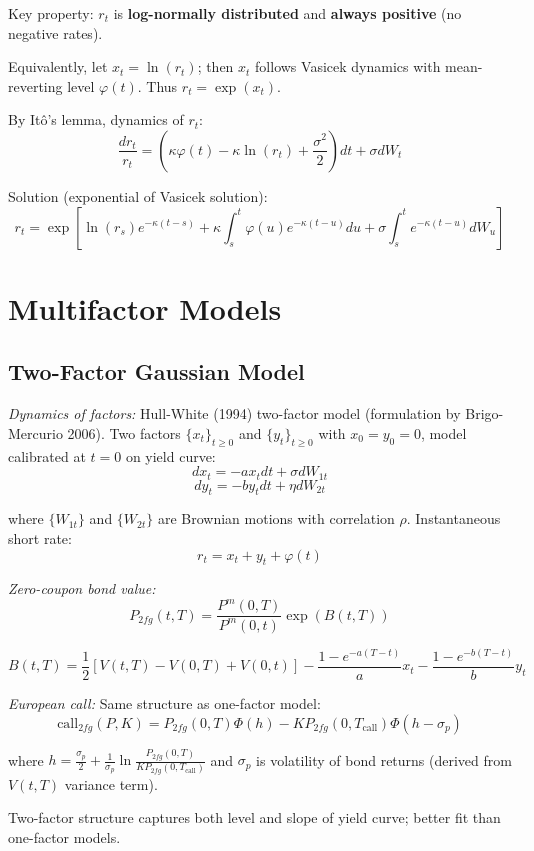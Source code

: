 \documentclass[12pt,a4paper]{article}
\begin{document}
Key property: $r_t$ is \textbf{log-normally distributed} and \textbf{always positive} (no negative rates). 

Equivalently, let $x_t = \ln(r_t)$; then $x_t$ follows Vasicek dynamics with mean-reverting level $\varphi(t)$. Thus $r_t = \exp(x_t)$.

By Itô's lemma, dynamics of $r_t$:
$$\frac{dr_t}{r_t} = \left(\kappa\varphi(t) - \kappa\ln(r_t) + \frac{\sigma^2}{2}\right)dt + \sigma dW_t$$

Solution (exponential of Vasicek solution):
$$r_t = \exp\left[\ln(r_s)e^{-\kappa(t-s)} + \kappa\int_s^t \varphi(u)e^{-\kappa(t-u)}du + \sigma\int_s^t e^{-\kappa(t-u)}dW_u\right]$$




\section{Multifactor Models}

\subsection{Two-Factor Gaussian Model}

\textit{Dynamics of factors:} Hull-White (1994) two-factor model (formulation by Brigo-Mercurio 2006). Two factors $\{x_t\}_{t \geq 0}$ and $\{y_t\}_{t \geq 0}$ with $x_0 = y_0 = 0$, model calibrated at $t=0$ on yield curve:
$$dx_t = -ax_t dt + \sigma dW_{1t}$$
$$dy_t = -by_t dt + \eta dW_{2t}$$

where $\{W_{1t}\}$ and $\{W_{2t}\}$ are Brownian motions with correlation $\rho$. Instantaneous short rate:
$$r_t = x_t + y_t + \varphi(t)$$

\textit{Zero-coupon bond value:}
$$P_{2fg}(t,T) = \frac{P^m(0,T)}{P^m(0,t)}\exp(B(t,T))$$
 
$$B(t,T) = \frac{1}{2}[V(t,T) - V(0,T) + V(0,t)] - \frac{1-e^{-a(T-t)}}{a}x_t - \frac{1-e^{-b(T-t)}}{b}y_t$$

\textit{European call:} Same structure as one-factor model:
$$\text{call}_{2fg}(P,K) = P_{2fg}(0,T)\Phi(h) - KP_{2fg}(0,T_{\text{call}})\Phi(h - \sigma_p)$$

where $h = \frac{\sigma_p}{2} + \frac{1}{\sigma_p}\ln\frac{P_{2fg}(0,T)}{KP_{2fg}(0,T_{\text{call}})}$ and $\sigma_p$ is volatility of bond returns (derived from $V(t,T)$ variance term).

Two-factor structure captures both level and slope of yield curve; better fit than one-factor models.
\end{document}
